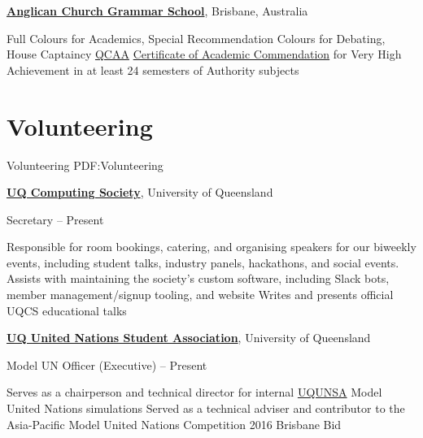 \documentclass[a4paper,10pt,oneside]{article}
\begin{document}
\begin{body}
\EntryGap

\href{https://www.churchie.com.au/}{\textbf{Anglican Church Grammar School}}, Brisbane, Australia
\begin{detail}
\BulletItem Full Colours for Academics, Special Recommendation Colours for Debating, House Captaincy \hfill {}
\BulletItem \href{https://www.qcaa.qld.edu.au/}{QCAA} \href{https://www.qcaa.qld.edu.au/senior/certificates-qualifications/qce/qce-achievement-awards/certificate-academic-commendation/2014}{Certificate of Academic Commendation} for Very High Achievement in at least 24 semesters of Authority subjects \hfill {}
\end{detail}


\section
{Volunteering}
{Volunteering}
{PDF:Volunteering}

\href{https://uqcs.org.au/}
{\textbf{UQ Computing Society}}, University of Queensland

\par Secretary\hfill {} -- Present

\begin{detail}
\BulletItem Responsible for room bookings, catering, and organising speakers for our biweekly events, including student talks, industry panels, hackathons, and social events.
\BulletItem Assists with maintaining the society's custom software, including Slack bots, member management/signup tooling, and website
\BulletItem Writes and presents official UQCS educational talks
\end{detail}

\EntryGap

\href{http://www.unsauq.org/}
{\textbf{UQ United Nations Student Association}}, University of Queensland

\par Model UN Officer (Executive)\hfill {} -- Present

\begin{detail}
\BulletItem Serves as a chairperson and technical director for internal \href{http://www.unsauq.org/}{UQUNSA} Model United Nations simulations 
\BulletItem Served as a technical adviser and contributor to the Asia-Pacific Model United Nations Competition 2016 Brisbane Bid
\end{detail}


\end{body}
\end{document}

